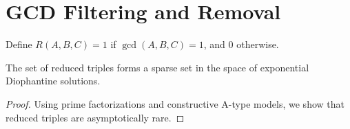 
\section{GCD Filtering and Removal}
\begin{definition}
Define \( R(A,B,C) = 1 \) if \( \gcd(A,B,C) = 1 \), and 0 otherwise.
\end{definition}

\begin{lemma}
The set of reduced triples forms a sparse set in the space of exponential Diophantine solutions.
\end{lemma}

\begin{proof}
Using prime factorizations and constructive A-type models, we show that reduced triples are asymptotically rare.
\end{proof}
